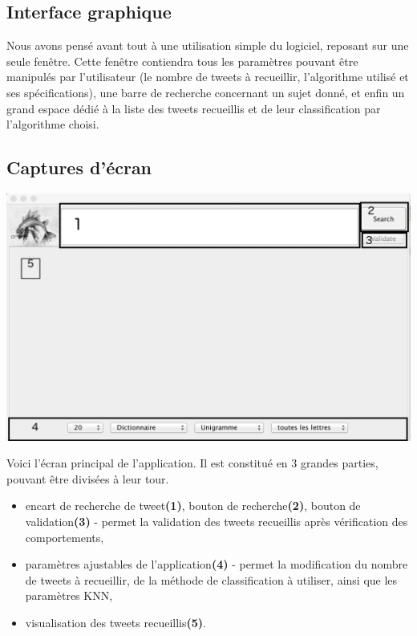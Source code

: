 \documentclass[pdftex,12pt,a4paper]{report}
\begin{document}
\begin{spacing}{1.2}
\section{Interface graphique}

Nous avons pensé avant tout à une utilisation simple du logiciel, reposant sur une seule fenêtre. Cette fenêtre contiendra tous les paramètres pouvant être manipulés par l'utilisateur (le nombre de tweets à recueillir, l'algorithme utilisé et ses spécifications), une barre de recherche concernant un sujet donné, et enfin un grand espace dédié à la liste des tweets recueillis et de leur classification par l'algorithme choisi.

\subsection{Captures d'écran}

\includegraphics[scale=0.5]{img/BehAnTweet_annotation.jpeg}

Voici l'écran principal de l'application. Il est constitué en 3 grandes parties, pouvant être divisées à leur tour.
\begin{itemize}
\item{encart de recherche de tweet\textbf{(1)}, bouton de recherche\textbf{(2)}, bouton de validation\textbf{(3)} - permet la validation des tweets recueillis après vérification des comportements,}
\item{paramètres ajustables de l'application\textbf{(4)} - permet la modification du nombre de tweets à recueillir, de la méthode de classification à utiliser, ainsi que les paramètres KNN,}
\item{visualisation des tweets recueillis\textbf{(5)}.}
\end{itemize}


\end{spacing}
\end{document}
